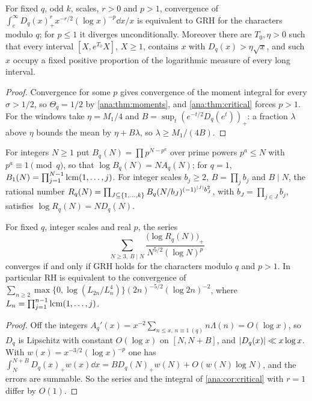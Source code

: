 \begin{corollary}\label{ana:cor:critical}
For fixed $q$, odd $k$, scales, $r>0$ and $p>1$, convergence of
$\int_e^\infty D_q(x)_+^rx^{-r/2}(\log x)^{-p}\dd x/x$ is equivalent to GRH for the characters
modulo $q$; for $p\le1$ it diverges unconditionally. Moreover there are $T_0,\eta>0$ such that
every interval $[X,e^{T_0}X]$, $X\ge1$, contains $x$ with $D_q(x)>\eta\sqrt x$, and such $x$
occupy a fixed positive proportion of the logarithmic measure of every long interval.
\end{corollary}

\begin{proof}
Convergence for some $p$ gives convergence of the moment integral for every $\sigma>1/2$, so
$\Theta_q=1/2$ by \cref{ana:thm:moments}, and \cref{ana:thm:critical} forces $p>1$. For the
windows take $\eta=M_1/4$ and $B=\sup_t(e^{-t/2}D_q(e^t))_+$: a fraction $\lambda$ above $\eta$
bounds the mean by $\eta+B\lambda$, so $\lambda\ge M_1/(4B)$.
\end{proof}

For integers $N\ge1$ put $B_q(N)=\prod p^{N-p^a}$ over prime powers $p^a\le N$ with
$p^a\equiv1\pmod q$, so that $\log B_q(N)=NA_q(N)$; for $q=1$,
$B_1(N)=\prod_{j=1}^{N-1}\operatorname{lcm}(1,\dots,j)$. For integer scales $b_j\ge2$, $B=\prod_jb_j$ and
$B\mid N$, the rational number
$R_q(N)=\prod_{J\subseteq\{1,\dots,k\}}B_q(N/b_J)^{(-1)^{\lvert J\rvert}b_J^2}$, with
$b_J=\prod_{j\in J}b_j$, satisfies $\log R_q(N)=ND_q(N)$.

\begin{theorem}\label{ana:thm:lcm}
For fixed $q$, integer scales and real $p$, the series
\[
 \sum_{N\ge3,\ B\mid N}\frac{\bigl(\log R_q(N)\bigr)_+}{N^{5/2}(\log N)^p}
\]
converges if and only if GRH holds for the characters modulo $q$ and $p>1$. In particular RH
is equivalent to the convergence of
$\sum_{n\ge2}\max\{0,\log(L_{2n}/L_n^4)\}(2n)^{-5/2}(\log2n)^{-2}$, where
$L_n=\prod_{j=1}^{n-1}\operatorname{lcm}(1,\dots,j)$.
\end{theorem}

\begin{proof}
Off the integers $A_q'(x)=x^{-2}\sum_{n\le x,\,n\equiv1\ (q)}n\Lambda(n)=O(\log x)$, so $D_q$
is Lipschitz with constant $O(\log x)$ on $[N,N+B]$, and $\lvert D_q(x)\rvert\ll x\log x$. With
$w(x)=x^{-3/2}(\log x)^{-p}$ one has
$\int_N^{N+B}D_q(x)_+w(x)\dd x=BD_q(N)_+w(N)+O(w(N)\log N)$, and the errors are summable.
So the series and the integral of \cref{ana:cor:critical} with $r=1$ differ by $O(1)$.
\end{proof}

